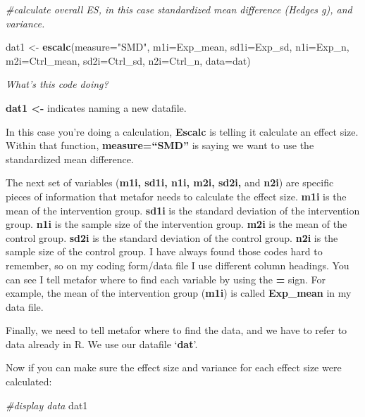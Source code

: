 \documentclass[
]{book}
\newenvironment{Shaded}{\begin{snugshade}}{\end{snugshade}}
\newcommand{\AttributeTok}[1]{\textcolor[rgb]{0.13,0.29,0.53}{#1}}
\newcommand{\CommentTok}[1]{\textcolor[rgb]{0.56,0.35,0.01}{\textit{#1}}}
\newcommand{\FunctionTok}[1]{\textcolor[rgb]{0.13,0.29,0.53}{\textbf{#1}}}
\newcommand{\NormalTok}[1]{#1}
\newcommand{\OtherTok}[1]{\textcolor[rgb]{0.56,0.35,0.01}{#1}}
\newcommand{\StringTok}[1]{\textcolor[rgb]{0.31,0.60,0.02}{#1}}
\begin{document}
\begin{Shaded}
\begin{Highlighting}[]
\CommentTok{\#calculate overall ES, in this case standardized mean difference (Hedges g), and variance.}

\NormalTok{dat1 }\OtherTok{\textless{}{-}} \FunctionTok{escalc}\NormalTok{(}\AttributeTok{measure=}\StringTok{"SMD"}\NormalTok{, }\AttributeTok{m1i=}\NormalTok{Exp\_mean, }\AttributeTok{sd1i=}\NormalTok{Exp\_sd, }\AttributeTok{n1i=}\NormalTok{Exp\_n, }\AttributeTok{m2i=}\NormalTok{Ctrl\_mean, }\AttributeTok{sd2i=}\NormalTok{Ctrl\_sd, }\AttributeTok{n2i=}\NormalTok{Ctrl\_n, }\AttributeTok{data=}\NormalTok{dat)}
\end{Highlighting}
\end{Shaded}

\emph{What's this code doing?}

\textbf{dat1 \textless-} indicates naming a new datafile.

In this case you're doing a calculation, \textbf{Escalc} is telling it calculate an effect size. Within that function, \textbf{measure=``SMD''} is saying we want to use the standardized mean difference.

The next set of variables (\textbf{m1i, sd1i, n1i, m2i, sd2i,} and \textbf{n2i}) are specific pieces of information that metafor needs to calculate the effect size. \textbf{m1i} is the mean of the intervention group. \textbf{sd1i} is the standard deviation of the intervention group. \textbf{n1i} is the sample size of the intervention group. \textbf{m2i} is the mean of the control group. \textbf{sd2i} is the standard deviation of the control group. \textbf{n2i} is the sample size of the control group. I have always found those codes hard to remember, so on my coding form/data file I use different column headings. You can see I tell metafor where to find each variable by using the \textbf{=} sign. For example, the mean of the intervention group (\textbf{m1i}) is called \textbf{Exp\_mean} in my data file.

Finally, we need to tell metafor where to find the data, and we have to refer to data already in R. We use our datafile `\textbf{dat}'.

Now if you can make sure the effect size and variance for each effect size were calculated:

\begin{Shaded}
\begin{Highlighting}[]
\CommentTok{\#display data}
\NormalTok{dat1}
\end{Highlighting}
\end{Shaded}
\end{document}
